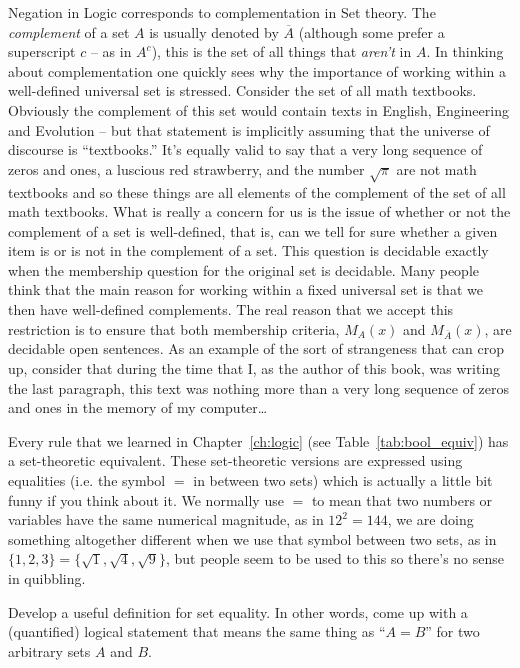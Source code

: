 Negation in Logic corresponds to 
complementation in Set theory.  The 
\emph{complement} of a set $A$ is usually denoted by $\overline{A}$ 
(although some prefer a superscript $c$ -- as in $A^c$), this is the set
of all things that \emph{aren't} in $A$.  In thinking about complementation
one quickly sees why the importance of working within a well-defined
universal set is stressed.  Consider the set of all math textbooks.
Obviously the complement of this set would contain texts in English,
Engineering and Evolution -- but that statement is implicitly 
assuming that the universe of discourse is ``textbooks.''   It's equally
valid to say that a very long sequence of zeros and ones, a luscious 
red strawberry, and the number $\sqrt{\pi}$ 
are not math textbooks and so
these things are all elements of the complement of the set of all math
textbooks.  What is really a concern for us is the issue of whether or not
the complement of a set is well-defined, that is, can we tell for sure
whether a given item is or is not in the complement of a set.  This 
question is decidable exactly when the membership question for the
original set is decidable.   Many people think that the main
reason for working within a fixed universal set is that we then 
have well-defined complements.  The real reason that we accept
this restriction is to ensure that both membership criteria,
$M_A(x)$ and $M_{\overline{A}}(x)$, are decidable open sentences.
As an example of the sort of strangeness that can crop up, consider that
during the time that I, as the author of this book, was writing the 
last paragraph, this text was nothing more than a very long
sequence of zeros and ones in the memory of my computer\ldots

Every rule that we learned in Chapter~\ref{ch:logic} 
(see Table~\ref{tab:bool_equiv}) has a set-theoretic equivalent.  
These set-theoretic versions are
expressed using equalities (i.e. the symbol $=$ in between two sets) which
is actually a little bit funny if you think about it.  We normally
use $=$ to mean that two numbers or variables have the same numerical
magnitude, as in $12^2 = 144$, we are doing something altogether
different when we use that symbol between two sets, as in $\{1,2,3\}=
\{\sqrt{1},\sqrt{4},\sqrt{9}\}$, but people seem to be used to this
so there's no sense in quibbling.

\begin{exer}
Develop a useful definition for set equality.  In other words,
come up with a (quantified) logical statement that means the
same thing as ``$A = B$'' for two arbitrary sets $A$ and $B$.
\end{exer}

